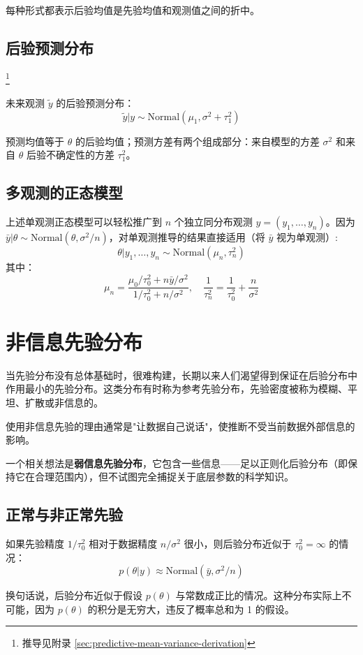 每种形式都表示后验均值是先验均值和观测值之间的折中。

\subsection{后验预测分布}\footnote{推导见附录 \cref{sec:predictive-mean-variance-derivation}}

未来观测 $\tilde{y}$ 的后验预测分布：
\[
\tilde{y}|y \sim \text{Normal}(\mu_1, \sigma^2 + \tau_1^2)
\]

预测均值等于 $\theta$ 的后验均值；预测方差有两个组成部分：来自模型的方差 $\sigma^2$ 和来自 $\theta$ 后验不确定性的方差 $\tau_1^2$。

\subsection{多观测的正态模型}

上述单观测正态模型可以轻松推广到 $n$ 个独立同分布观测 $y = (y_1, \ldots, y_n)$。因为 $\bar{y}|\theta \sim \text{Normal}(\theta, \sigma^2/n)$，对单观测推导的结果直接适用（将 $\bar{y}$ 视为单观测）:
\[
\theta|y_1,\ldots,y_n \sim \text{Normal}(\mu_n, \tau_n^2)
\]
其中：
\[
\mu_n = \frac{\mu_0/\tau_0^2 + n\bar{y}/\sigma^2}{1/\tau_0^2 + n/\sigma^2}, \quad
\frac{1}{\tau_n^2} = \frac{1}{\tau_0^2} + \frac{n}{\sigma^2}
\]

\section{非信息先验分布}

当先验分布没有总体基础时，很难构建，长期以来人们渴望得到保证在后验分布中作用最小的先验分布。这类分布有时称为参考先验分布，先验密度被称为模糊、平坦、扩散或非信息的。

使用非信息先验的理由通常是"让数据自己说话"，使推断不受当前数据外部信息的影响。

一个相关想法是\textbf{弱信息先验分布}，它包含一些信息——足以正则化后验分布（即保持它在合理范围内），但不试图完全捕捉关于底层参数的科学知识。

\subsection{正常与非正常先验}

如果先验精度 $1/\tau_0^2$ 相对于数据精度 $n/\sigma^2$ 很小，则后验分布近似于 $\tau_0^2 = \infty$ 的情况：
\[
p(\theta|y) \approx \text{Normal}(\bar{y}, \sigma^2/n)
\]

换句话说，后验分布近似于假设 $p(\theta)$ 与常数成正比的情况。这种分布实际上不可能，因为 $p(\theta)$ 的积分是无穷大，违反了概率总和为 1 的假设。

